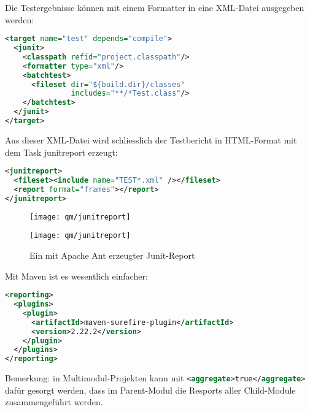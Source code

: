 \newslide
Die Testergebnisse können mit einem Formatter in eine XML-Datei ausgegeben
werden:
\begin{lstlisting}[language=xml,
  morekeywords={target,formatter,junit,classpath,batchtest,fileset}]
<target name="test" depends="compile">
  <junit>
    <classpath refid="project.classpath"/>
    <formatter type="xml"/>
    <batchtest>
      <fileset dir="${build.dir}/classes"
               includes="**/*Test.class"/>
    </batchtest>
  </junit>
</target>
\end{lstlisting}
\newslide
Aus dieser XML-Datei wird schliesslich
der Testbericht in HTML-Format mit dem Task junitreport erzeugt:
\begin{lstlisting}[language=xml,morekeywords={junitreport,report,fileset}]
<junitreport>
  <fileset><include name="TEST*.xml" /></fileset>
  <report format="frames"></report>
</junitreport>
\end{lstlisting}
\begin{figure}[H]
\ifslides
\begin{center}
\texttt{[image: qm/junitreport]}
\end{center}
\else
\texttt{[image: qm/junitreport]}
\fi
\caption{Ein mit Apache Ant erzeugter Junit-Report}
\end{figure}
%
%
%
%
%
%
\newslide
Mit Maven ist es wesentlich einfacher:
\begin{lstlisting}[language=xml,
  morekeywords={reporting,plugins,plugin,artifactId}]
<reporting>
  <plugins>
    <plugin>
      <artifactId>maven-surefire-plugin</artifactId>
      <version>2.22.2</version>
    </plugin>
  </plugins>
</reporting>
\end{lstlisting}
Bemerkung: in Multimodul-Projekten kann mit
\lstinline[language=xml]{<aggregate>true</aggregate>}
dafür gesorgt werden, dass im
Parent-Modul die Resports aller Child-Module zusammengeführt werden.
%
\newslide
